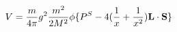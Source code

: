 \begin{equation}
V = \frac{m}{4 \pi} g^{2} \frac{m^{2}}{2 M^{2}} \phi
\{ P^{S} - 4 (\frac{1}{x}+ \frac{1}{x^{2}}) {\bf L} \cdot {\bf S} \}    \label{eq:ia}
\end{equation}


